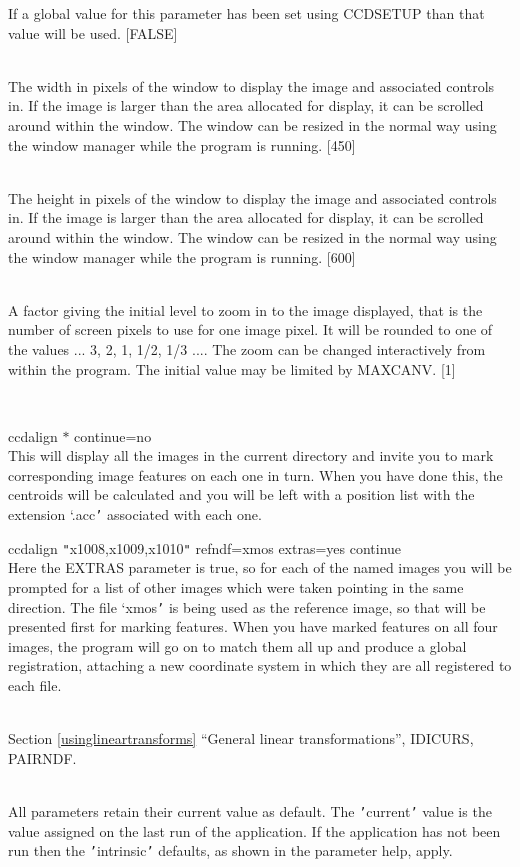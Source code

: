 \documentclass[twoside,11pt]{article}
\newcommand{\htmlref}[2]{#1}
\newcommand{\latexhtml}[2]{#1}
\renewcommand{\_}{\texttt{\symbol{95}}}
\newcommand{\xroutine}[1]{\htmlref{{\sc #1}}{#1}}
\newcommand{\secref}[2]{\latexhtml{Section \ref{#1} ``#2''}{``\htmlref{#2}{#1}''}}
\newcommand{\sstexamples}[1]{
   \item[Examples:] \mbox{} \\
   \vspace{-3.5ex}
   \begin{description}
      #1
   \end{description}
}
\newcommand{\sstsubsection}[1]{ \item[{#1}] \mbox{} \\}
\newcommand{\sstexamplesubsection}[2]{\sloppy \item{\ssttt #1} \mbox{} \\ #2 }
\newcommand{\sstdiytopic}[2]{\item[#1:] \mbox{} \\[1.3ex] #2}
\newcommand{\sstexamples}[1]{
      \item[Examples:] \\
      \begin{description}
         #1
      \end{description}
      \\
   }
\newcommand{\sstsubsection}[1]{\item[{#1}]}
\newcommand{\sstexamplesubsection}[2]{\item[{\ssttt #1}] #2}
\newcommand{\sstdiytopic}[2]{\item[{#1:}] #2 }
\begin{document}
{{{         If a global value for this parameter has been set using
         \xroutine{CCDSETUP} than that value will be used.
         [FALSE]
      }
      \sstsubsection{
         WINX = INTEGER (Read and Write)
      }{
         The width in pixels of the window to display the image and
         associated controls in.  If the image is larger than the area
         allocated for display, it can be scrolled around within the
         window.  The window can be resized in the normal way using
         the window manager while the program is running.
         [450]
      }
      \sstsubsection{
         WINY = INTEGER (Read and Write)
      }{
         The height in pixels of the window to display the image and
         associated controls in.  If the image is larger than the area
         allocated for display, it can be scrolled around within the
         window.  The window can be resized in the normal way using
         the window manager while the program is running.
         [600]
      }
      \sstsubsection{
         ZOOM = DOUBLE (Read and Write)
      }{
         A factor giving the initial level to zoom in to the image
         displayed, that is the number of screen pixels to use for one
         image pixel.  It will be rounded to one of the values
         ... 3, 2, 1, 1/2, 1/3 ....  The zoom can be changed
         interactively from within the program.  The initial value
         may be limited by MAXCANV.
         [1]
      }
   }
   \sstexamples{
      \sstexamplesubsection{
         ccdalign $*$ continue=no
      }{
         This will display all the images in the current directory and
         invite you to mark corresponding image features on each one
         in turn.  When you have done this, the centroids will be
         calculated and you will be left with a position list with
         the extension `.acc{\tt '} associated with each one.
      }
      \sstexamplesubsection{
         ccdalign {\tt "}x1008,x1009,x1010{\tt "} refndf=xmos extras=yes continue
      }{
         Here the EXTRAS parameter is true, so for each of the named
         images you will be prompted for a list of other images
         which were taken pointing in the same direction.
         The file `xmos{\tt '} is being used as the reference image,
         so that will be presented first for marking features.
         When you have marked features on all four images, the
         program will go on to match them all up and produce a
         global registration, attaching a new coordinate system in
         which they are all registered to each file.
      }
   }
   \sstdiytopic{
      See also
   } {
      \secref{usinglineartransforms}{General linear transformations},
      \xroutine{IDICURS}, 
      \xroutine{PAIRNDF}.
   }
   \sstdiytopic{
      Behaviour of parameters
   }{
      All parameters retain their current value as default. The
      {\tt '}current{\tt '} value is the value assigned on the last run of the
      application. If the application has not been run then the
      {\tt '}intrinsic{\tt '} defaults, as shown in the parameter help, apply.

}}
\end{document}
